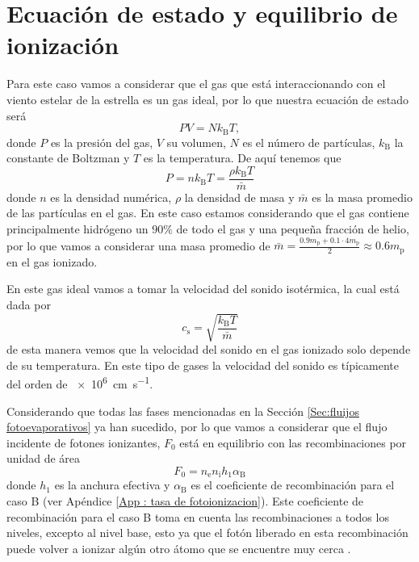 \documentclass{book}
\begin{document}

\section{Ecuación de estado y equilibrio de ionización}

Para este caso vamos a considerar que el gas que está interaccionando con el viento estelar de la estrella es un gas ideal, por lo que nuestra ecuación de estado será
\begin{equation}
    PV = Nk_\mathrm{B}T,
\end{equation} 
donde $P$ es la presión del gas, $V$ su volumen, $N$ es el número de partículas, $k_\mathrm{B}$ la constante de Boltzman y $T$ es la temperatura. De aquí tenemos que \begin{equation}
    P = nk_\mathrm{B}T = \frac{\rho k_\mathrm{B} T}{\bar{m}}
\end{equation}
donde $n$ es la densidad numérica, $\rho$ la densidad de masa y $\bar{m}$ es la masa promedio de las partículas en el gas. En este caso estamos considerando que el gas contiene principalmente hidrógeno un $90\%$ de todo el gas y una pequeña fracción de helio, por lo que vamos a considerar una masa promedio de $\bar{m}=\frac{0.9 m_\mathrm{p}+0.1\cdot4m_\mathrm{p}}{2}\approx0.6 m_{\mathrm{p}}$ en el gas ionizado.

En este gas ideal vamos a tomar la velocidad del sonido isotérmica, la cual está dada por
\begin{equation}
    c_\mathrm{s}  = \sqrt{\frac{k_\mathrm{B} T}{\bar{m}}}
\end{equation} 
de esta manera vemos que la velocidad del sonido en el gas ionizado solo depende de su temperatura. En este tipo de gases la velocidad del sonido es típicamente del orden de \SI{e6}{cm.s^{-1}}.

Considerando que todas las fases mencionadas en la Sección \ref{Sec:fluijos fotoevaporativos} ya han sucedido, por lo que vamos a considerar que el flujo incidente de fotones ionizantes, $F_0$ está en equilibrio con las recombinaciones por unidad de área 
\begin{equation}
    F_0 = n_\mathrm{e}n_\mathrm{i}h_1\alpha_\mathrm{B}
\end{equation} 
donde $h_1$ es la anchura efectiva y  $\alpha_\mathrm{B}$ es el coeficiente de recombinación para el caso B (ver Apéndice \ref{App : tasa de fotoionizacion}). Este coeficiente de recombinación para el caso B toma en cuenta las recombinaciones a todos los niveles, excepto al nivel base, esto ya que el fotón liberado en esta recombinación puede volver a ionizar algún otro átomo que se encuentre muy cerca \citep{Dyson:book:1980}. 
\end{document}
